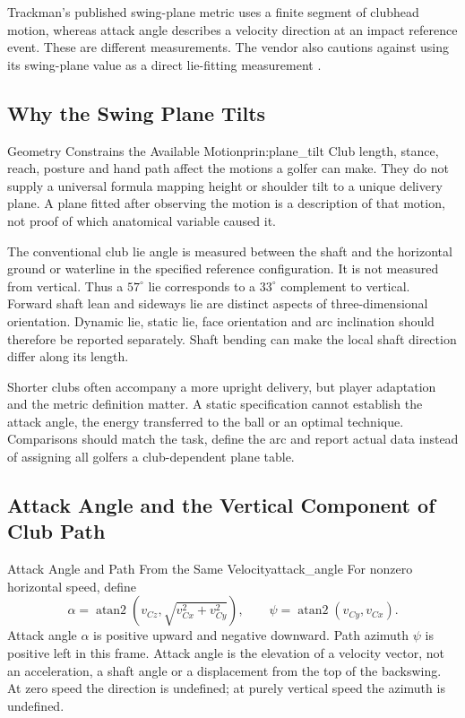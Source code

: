 Trackman's published swing-plane metric uses a finite segment of clubhead
motion, whereas attack angle describes a velocity direction at an impact
reference event. These are different measurements. The vendor also cautions
against using its swing-plane value as a direct lie-fitting measurement
\citep{Trackman2024SwingPlane,Trackman2020Parameters}.

\subsection{Why the Swing Plane Tilts}

\begin{principle}{Geometry Constrains the Available Motion}{prin:plane_tilt}
Club length, stance, reach, posture and hand path affect the motions a golfer
can make. They do not supply a universal formula mapping height or shoulder
tilt to a unique delivery plane. A plane fitted after observing the motion is
a description of that motion, not proof of which anatomical variable caused it.
\end{principle}

The conventional club lie angle is measured between the shaft and the
horizontal ground or waterline in the specified reference configuration.
It is not measured from vertical. Thus a $57^\circ$ lie corresponds to a
$33^\circ$ complement to vertical. Forward shaft lean and sideways lie are
distinct aspects of three-dimensional orientation. Dynamic lie, static lie,
face orientation and arc inclination should therefore be reported separately.
Shaft bending can make the local shaft direction differ along its length.

Shorter clubs often accompany a more upright delivery, but player adaptation
and the metric definition matter. A static specification cannot establish the
attack angle, the energy transferred to the ball or an optimal technique.
Comparisons should match the task, define the arc and report actual data
instead of assigning all golfers a club-dependent plane table.

\subsection{Attack Angle and the Vertical Component of Club Path}

\begin{definition}{Attack Angle and Path From the Same Velocity}{attack_angle}
For nonzero horizontal speed, define
\[
\alpha=\operatorname{atan2}(v_{Cz},\sqrt{v_{Cx}^2+v_{Cy}^2}),
\qquad \psi=\operatorname{atan2}(v_{Cy},v_{Cx}).
\]
Attack angle $\alpha$ is positive upward and negative downward. Path azimuth
$\psi$ is positive left in this frame. Attack angle is the elevation of a
velocity vector, not an acceleration, a shaft angle or a displacement from the
top of the backswing. At zero speed the direction is undefined; at purely
vertical speed the azimuth is undefined.
\end{definition}


